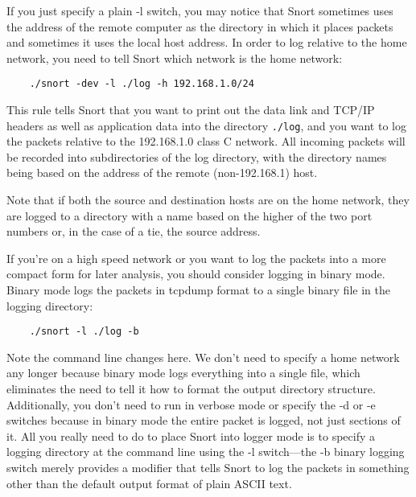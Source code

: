 \documentclass[english]{report}
\newenvironment{note}{
\samepage
    \vspace{10pt}{\textsf{
        {\hspace{7pt}\Huge{$\triangle$\hspace{-12.5pt}{\Large{$^!$}}}}\hspace{5pt}
        {\Large{NOTE}}
    }
    }
   \begin{center}
    \par\vspace{-17pt}

    \begin{lrbox}{\savepar}
    \begin{minipage}[r]{6in}
}
{
    \end{minipage}
    \end{lrbox}
    \fbox{
        \usebox{
            \savepar
	}
    }
    \par\vskip10pt
    \end{center}
}
\newenvironment{note}{
        \begin{rawhtml}
        <p><table border="1"><tr><td><b>
        Note:&nbsp;&nbsp;</b>
        \end{rawhtml}
}{
        \begin{rawhtml}
        </b></td></tr></table></p>
        \end{rawhtml}
}
\begin{document}
If you just specify a plain -l switch, you may notice that Snort sometimes uses
the address of the remote computer as the directory in which it places packets
and sometimes it uses the local host address. In order to log relative to the
home network, you need to tell Snort which network is the home network:

\begin{verbatim}
    ./snort -dev -l ./log -h 192.168.1.0/24
\end{verbatim}

This rule tells Snort that you want to print out the data link and TCP/IP
headers as well as application data into the directory \verb!./log!, and you
want to log the packets relative to the 192.168.1.0 class C network. All
incoming packets will be recorded into subdirectories of the log directory,
with the directory names being based on the address of the remote
(non-192.168.1) host. 

\begin{note}

Note that if both the source and destination hosts are on the home network,
they are logged to a directory with a name based on the higher of the two port
numbers or, in the case of a tie, the source address.

\end{note}

If you're on a high speed network or you want to log the packets into a more
compact form for later analysis, you should consider logging in binary mode.
Binary mode logs the packets in tcpdump format to a single binary file in the
logging directory:

\begin{verbatim}
    ./snort -l ./log -b
\end{verbatim}

Note the command line changes here. We don't need to specify a home network any
longer because binary mode logs everything into a single file, which eliminates
the need to tell it how to format the output directory structure. Additionally,
you don't need to run in verbose mode or specify the -d or -e switches because
in binary mode the entire packet is logged, not just sections of it. All you
really need to do to place Snort into logger mode is to specify a logging
directory at the command line using the -l switch---the -b binary logging
switch merely provides a modifier that tells Snort to log the packets in
something other than the default output format of plain ASCII text.
\end{document}
